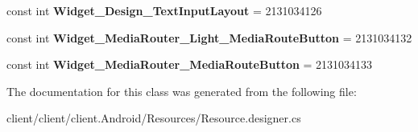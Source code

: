 \begin{DoxyCompactItemize}
\item 
\hypertarget{classClient_1_1Droid_1_1Resource_1_1Style_a5014252621fcb214103d8a7ebf370ac3}{}const int {\bfseries Widget\+\_\+\+Design\+\_\+\+Text\+Input\+Layout} = 2131034126\label{classClient_1_1Droid_1_1Resource_1_1Style_a5014252621fcb214103d8a7ebf370ac3}

\item 
\hypertarget{classClient_1_1Droid_1_1Resource_1_1Style_ad18816e65972f838707747cf52d887a8}{}const int {\bfseries Widget\+\_\+\+Media\+Router\+\_\+\+Light\+\_\+\+Media\+Route\+Button} = 2131034132\label{classClient_1_1Droid_1_1Resource_1_1Style_ad18816e65972f838707747cf52d887a8}

\item 
\hypertarget{classClient_1_1Droid_1_1Resource_1_1Style_a568c3555cebdc442472ef2c8a2c08882}{}const int {\bfseries Widget\+\_\+\+Media\+Router\+\_\+\+Media\+Route\+Button} = 2131034133\label{classClient_1_1Droid_1_1Resource_1_1Style_a568c3555cebdc442472ef2c8a2c08882}

\end{DoxyCompactItemize}


The documentation for this class was generated from the following file\+:\begin{DoxyCompactItemize}
\item 
client/client/client.\+Android/\+Resources/Resource.\+designer.\+cs\end{DoxyCompactItemize}
